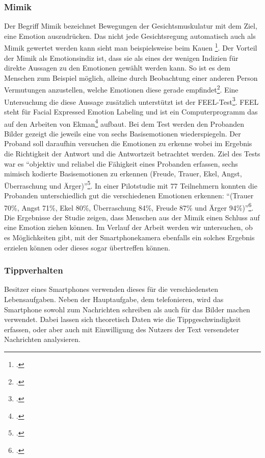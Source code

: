 \subsubsection{Mimik}
Der Begriff Mimik bezeichnet Bewegungen der Gesichtsmuskulatur mit dem Ziel, eine Emotion auszudrücken. Das nicht jede Gesichtsregung automatisch auch als Mimik gewertet werden kann sieht man beispielsweise beim Kauen \footcite[Vgl. ][Mimik: Eine kurze Definition]{Kar18}.\newline
Der Vorteil der Mimik als Emotionsindiz ist, dass sie als eines der wenigen Indizien für direkte Aussagen zu den Emotionen gewählt werden kann. So ist es dem Menschen zum Beispiel möglich, alleine durch Beobachtung einer anderen Person Vermutungen anzustellen, welche Emotionen diese gerade empfindet\footcite[Vgl. ][Die sieben Grundemotionen, Absatz 1]{Kar18}. Eine Untersuchung die diese Aussage zusätzlich unterstützt ist der FEEL-Test\footcite[][]{Kes02}. FEEL steht für Facial Expressed Emotion Labeling und ist ein Computerprogramm das auf den Arbeiten von Ekman\footcite{Ekm92} aufbaut. Bei dem Test werden den Probanden Bilder gezeigt die jeweils eine von sechs Basisemotionen wiederspiegeln. Der Proband soll daraufhin versuchen die Emotionen zu erkenne wobei im Ergebnis die Richtigkeit der Antwort und die Antwortzeit betrachtet werden. Ziel des Tests war es ``objektiv
und reliabel die Fähigkeit eines Probanden erfassen, sechs mimisch kodierte Basisemotionen zu erkennen (Freude, Trauer, Ekel, Angst, Überraschung und Ärger)''\footcite[siehe. ][S.5 Z.11ff]{Kes02}. In einer Pilotstudie mit 77 Teilnehmern konnten die Probanden unterschiedlich gut die verschiedenen Emotionen erkennen: ``(Trauer 
70\%, Angst 71\%, Ekel 80\%, Überraschung 84\%, Freude 87\% und Ärger 94\%)''\footcite[siehe. ][S.9 Z.9f]{Kes02}.\newline
Die Ergebnisse der Studie zeigen, dass Menschen aus der Mimik einen Schluss auf eine Emotion ziehen können. Im Verlauf der Arbeit werden wir untersuchen, ob es Möglichkeiten gibt, mit der Smartphonekamera ebenfalls ein solches Ergebnis erzielen können oder dieses sogar übertreffen können. 
\subsubsection{Tippverhalten}
Besitzer eines Smartphones verwenden dieses für die verschiedensten Lebensaufgaben. Neben der Hauptaufgabe, dem telefonieren, wird das Smartphone sowohl zum Nachrichten schreiben als auch für das Bilder machen verwendet. Dabei lassen sich theoretisch Daten wie die Tippgeschwindigkeit erfassen, oder aber auch mit Einwilligung des Nutzers der Text versendeter Nachrichten analysieren.

